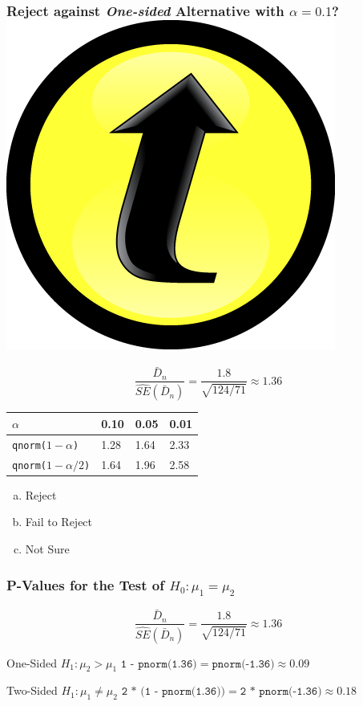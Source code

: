 \documentclass[handout]{beamer}
\begin{document}
\begin{frame}
\frametitle{Reject against \emph{One-sided} Alternative with $\alpha = 0.1$?  \includegraphics[scale = 0.05]{./images/clicker}}

	$$\boxed{\displaystyle \frac{\bar{D}_n}{\widehat{SE}(\bar{D}_n)}= \frac{1.8}{\sqrt{124/71}} \approx 1.36} $$

\begin{center}
\begin{tabular}{l|lll}
$\alpha$ &   0.10& 0.05 &0.01\\
\hline
\texttt{qnorm($1-\alpha$)} & 1.28 &1.64 &2.33\\
\texttt{qnorm($1-\alpha/2$)} &1.64 &1.96& 2.58
\end{tabular}
\end{center}

\begin{enumerate}[(a)]
\item Reject
\item Fail to Reject
\item Not Sure
\end{enumerate}



\end{frame}

\begin{frame}
\frametitle{P-Values for the Test of $H_0\colon \mu_1 = \mu_2$}

	$$\boxed{\displaystyle \frac{\bar{D}_n}{\widehat{SE}(\bar{D}_n)}= \frac{1.8}{\sqrt{124/71}} \approx 1.36} $$

\begin{block}{One-Sided $H_1\colon \mu_2 > \mu_1 $} 
$\texttt{1 - pnorm(1.36)} =  \texttt{pnorm(-1.36)}  \approx 0.09$ 
\end{block}

\begin{block}{Two-Sided $H_1 \colon \mu_1 \neq \mu_2$} 
$\texttt{2 * (1 - pnorm(1.36))} =  \texttt{2 * pnorm(-1.36)} \approx 0.18$
\end{block}
\end{frame}
\end{document}
